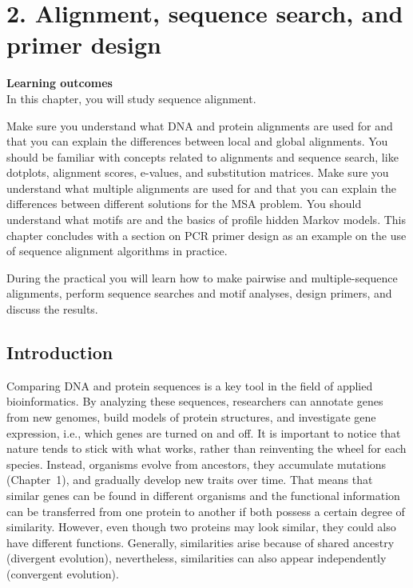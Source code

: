 \section{2. Alignment, sequence search, and primer design}

\begin{framed}
\textbf{Learning outcomes}\\
In this chapter, you will study sequence alignment.

Make sure you understand what DNA and protein alignments are used for and that you can explain the differences between local and global alignments.
You should be familiar with concepts related to alignments and sequence search, like dotplots, alignment scores, e-values, and substitution matrices.
Make sure you understand what multiple alignments are used for and that you can explain the differences between different solutions for the MSA problem.
You should understand what motifs are and the basics of profile hidden Markov models.
This chapter concludes with a section on PCR primer design as an example on the use of sequence alignment algorithms in practice.

During the practical you will learn how to make pairwise and multiple-sequence alignments, perform sequence searches and motif analyses, design primers, and discuss the results.
\end{framed}

\subsection{Introduction}


Comparing DNA and protein sequences is a key tool in the field of applied bioinformatics.
By analyzing these sequences, researchers can annotate genes from new genomes, build models of protein structures, and investigate gene expression, i.e., which genes are turned on and off.
It is important to notice that nature tends to stick with what works, rather than reinventing the wheel for each species.
Instead, organisms evolve from ancestors, they accumulate mutations (Chapter~1), and gradually develop new traits over time.
That means that similar genes can be found in different organisms and the functional information can be transferred from one protein to another if both possess a certain degree of similarity.
However, even though two proteins may look similar, they could also have different functions.
Generally, similarities arise because of shared ancestry (divergent evolution), nevertheless, similarities can also appear independently (convergent evolution).

